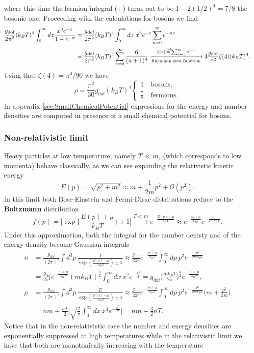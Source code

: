          where this time the fermion integral (+) turns out to be $1-2(1/2)^4=7/8$ the bosonic one. Proceeding with the calculations for bosons we find
\begin{align*}
   \frac{g_\text{dof}}{2\pi^2}(k_BT)^4\int_{0}^{\infty}dx\frac{x^3e^{-x}}{1-e^{-x}}  &=\frac{g_\text{dof}}{2\pi^2}(k_BT)^4\int_0^\infty dx\ x^3e^{-x}\sum_{n=0}^{\infty} e^{-nx}\nonumber\\&=\frac{g_\text{dof}}{2\pi^2}(k_BT)^4\sum_{n=0}^{\infty}\frac{6}{(n+1)^4}\xrightarrow[\text{Riemman zeta function}]{\zeta(z)\stackrel{\text{def}}{=}\sum_{n=1}^\infty n^{-z}}3\frac{g_\text{dof}}{\pi^2}\zeta(4)(k_BT)^4.
\end{align*}
Using that $\zeta(4)=\pi^4/90$ we have
\begin{equation}
    \rho=\frac{\pi^2}{30}g_\text{dof}(k_BT)^4\begin{cases}
        1\quad \text{bosons},\\
        \frac{7}{8}\quad \text{fermions.}
    \end{cases}
    \label{eq:relativistic_energy_density}
\end{equation}
In appendix \ref{sec:SmallChemicalPotential} expressions for the energy and number densities are computed in presence of a small chemical potential for bosons. 
\subsubsection{Non-relativistic limit}
Heavy particles at low temperature, namely $T\ll m$, (which corresponds to low momenta) behave classically, as we can see expanding the relativistic kinetic energy
$$
E(p)=\sqrt{p^2+m^2}\approx m+ \frac{1}{2m}p^2+\mathcal{O}(p^2).
$$ 
In this limit both Bose-Einstein and Fermi-Dirac distributions reduce to the \textbf{Boltzmann} distribution
$$
f(p)=\bigg[\exp\bigg\{\frac{E(p)+\mu}{k_BT}\bigg\}\pm1\bigg]\xrightarrow{T\ll m}e^{-\frac{E(p)+\mu}{k_BT}}\approx e^{-\frac{m+\mu}{k_BT}}e^{-\frac{p^2}{2mk_BT}}.
$$
Under this approximation, both the integral for the number denisty and of the energy density become Gaussian integrals
\begin{align}
    n&=\frac{g_\text{dof}}{(2\pi)^3}\int d^3p\ \frac{1}{\exp(\frac{E(p)+\mu}{k_BT})\pm1}\approx\frac{g_\text{dof}}{2\pi^2}e^{-\frac{m+\mu}{k_BT}}\int_{0}^{\infty}dp\ p^2  e^{-\frac{p^2}{2mk_BT}}\nonumber\\
    &=\frac{g_\text{dof}}{2\pi^2}e^{-\frac{m+\mu}{k_BT}}(mk_BT)^{\frac{3}{2}}\int_{0}^{\infty}dx\ x^2  e^{-\frac{x^2}{2}}=g_\text{dof}\bigg(\frac{mk_BT}{2\pi}\bigg)^{\frac{3}{2}}e^{-\frac{m+\mu}{k_BT}},\label{eq:nonrel_number_density}\\
    \rho&=\frac{g_\text{dof}}{(2\pi)^3}\int d^3p\ \frac{E}{\exp(\frac{E(p)+\mu}{k_BT})\pm1}\approx\frac{g_\text{dof}}{2\pi^2}e^{-\frac{m+\mu}{k_BT}}\int_{0}^{\infty}dp\ p^2  e^{-\frac{p^2}{2mk_BT}}\bigg(m+\frac{p^2}{2m}\bigg)\nonumber\\
    &=nm+\frac{nT}{2}\bigg[\sqrt{\frac{2}{\pi}}\int_{0}^{\infty}dx\ x^4  e^{-\frac{x^2}{2}}\bigg]=nm+\frac{3}{2}nT.
\end{align}
Notice that in the non-relativistic case the number and energy densities are exponentially suppressed at high temperatures while in the relativistic limit we have that both are monotonically increasing with the temperature
